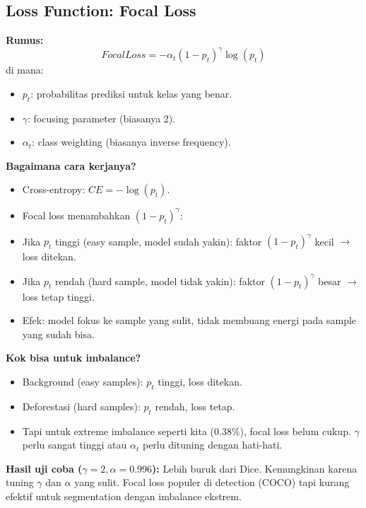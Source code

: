 \documentclass[10pt,a4paper,onecolumn]{article}
\begin{document}
\subsection{Loss Function: Focal Loss}

\textbf{Rumus:}
$$FocalLoss = -\alpha_t (1 - p_t)^\gamma \log(p_t)$$
di mana:
\begin{itemize}[nosep]
    \item $p_t$: probabilitas prediksi untuk kelas yang benar.
    \item $\gamma$: focusing parameter (biasanya 2).
    \item $\alpha_t$: class weighting (biasanya inverse frequency).
\end{itemize}

\textbf{Bagaimana cara kerjanya?}
\begin{itemize}[nosep]
    \item Cross-entropy: $CE = -\log(p_t)$.
    \item Focal loss menambahkan $(1 - p_t)^\gamma$:
    \item Jika $p_t$ tinggi (easy sample, model sudah yakin): faktor
          $(1 - p_t)^\gamma$ kecil $\rightarrow$ loss ditekan.
    \item Jika $p_t$ rendah (hard sample, model tidak yakin): faktor
          $(1 - p_t)^\gamma$ besar $\rightarrow$ loss tetap tinggi.
    \item Efek: model fokus ke sample yang sulit, tidak membuang
          energi pada sample yang sudah bisa.
\end{itemize}

\textbf{Kok bisa untuk imbalance?}
\begin{itemize}[nosep]
    \item Background (easy samples): $p_t$ tinggi, loss ditekan.
    \item Deforestasi (hard samples): $p_t$ rendah, loss tetap.
    \item Tapi untuk extreme imbalance seperti kita (0.38\%),
          focal loss belum cukup. $\gamma$ perlu sangat tinggi atau
          $\alpha_t$ perlu dituning dengan hati-hati.
\end{itemize}

\textbf{Hasil uji coba ($\gamma=2, \alpha=0.996$):}
Lebih buruk dari Dice. Kemungkinan karena tuning $\gamma$ dan
$\alpha$ yang sulit. Focal loss populer di detection (COCO) tapi
kurang efektif untuk segmentation dengan imbalance ekstrem.
\end{document}

